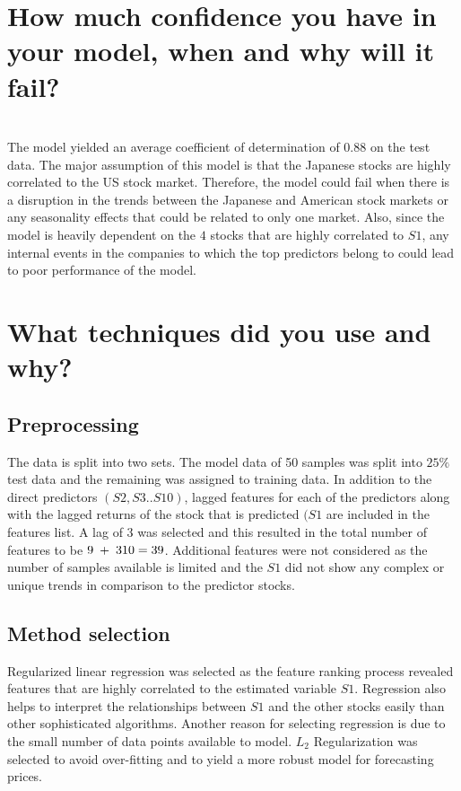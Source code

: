\documentclass[11pt]{article}
\begin{document}
{\section{How much confidence you have in your model, when and why will it fail?} \\ 
The model yielded an average coefficient of determination of \(0.88\) on the test data. The major assumption of this model is that the Japanese stocks are highly correlated to the US stock market. Therefore, the model could fail when there is a disruption in the trends between the Japanese and American stock markets or any seasonality effects that could be related to only one market. Also, since the model is heavily dependent on the \(4\) stocks that are highly correlated to \(S1\), any internal events in the companies to which the top predictors belong to could lead to poor performance of the model.

\section{What techniques did you use and why?}
\subsection{Preprocessing}
The data is split into two sets. The model data of 50 samples was split into \(25\%\) test data and the remaining was assigned to training data. In addition to the direct predictors \((S2,S3..S10)\), lagged features for each of the predictors along with the lagged returns of the stock that is predicted \((S1\) are included in the features list. A lag of \(3\) was selected and this resulted in the total number of features to be \(9 \;  + \; 3 \* 10 = 39\). Additional features were not considered as the number of samples available is limited and the \(S1\) did not show any complex or unique trends in comparison to the predictor stocks.


\subsection{Method selection}
Regularized linear regression was selected as the feature ranking process revealed features that are highly correlated to the estimated variable \(S1\). Regression also helps to interpret the relationships between \(S1\) and the other stocks easily than other sophisticated algorithms. Another reason for selecting regression is due to the small number of data points available to model. \(L_{2}\) Regularization was selected to avoid over-fitting and to yield a more robust model for forecasting prices.

}
\end{document}
